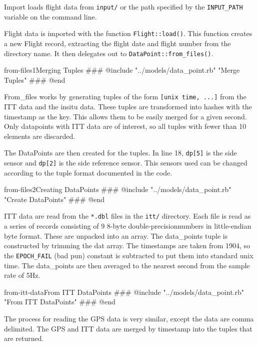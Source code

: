 \documentclass[12pt]{article}
\begin{document}
Import loads flight data from \texttt{input/} or the path specified by the \texttt{INPUT\_PATH} variable on the command line.  

Flight data is imported with the function \texttt{Flight::load()}. This function creates a new Flight record, extracting the flight date and flight number from the directory name.  It then delegates out to \texttt{DataPoint::from\_files()}.

\begin{code}{from-files1}{Merging Tuples}
### @include "../models/data_point.rb" "Merge Tuples"
### @end
\end{code}

From\_files works by generating tuples of the form \texttt{[unix time, ...]} from the ITT data and the insitu data. These tuples are transformed into hashes with the timestamp as the key.  This allows them to be easily merged for a given second.  Only datapoints with ITT data are of interest, so all tuples with fewer than 10 elements are discarded.

The DataPoints are then created for the tuples.  In line 18, \texttt{dp[5]} is the side sensor and \texttt{dp[2]} is the side reference sensor.  This sensors used can be changed according to the tuple format documented in the code. 

\begin{code}{from-files2}{Creating DataPoints}
### @include "../models/data_point.rb" "Create DataPoints"
### @end
\end{code}

ITT data are read from the \texttt{*.dbl} files in the \texttt{itt/} directory.  Each file is read as a series of records consisting of 9 8-byte double-precisionnumbers in little-endian byte format.  These are unpacked into an array.  The data\_points tuple is constructed by trimming the dat array.  The timestamps are taken from 1904, so the \texttt{EPOCH\_FAIL} (bad pun) constant is subtracted to put them into standard unix time.  The data\_points are then averaged to the nearest second from the sample rate of 5Hz.

\begin{code}{from-itt-data}{From ITT DataPoints}
### @include "../models/data_point.rb" "From ITT DataPoints"
### @end
\end{code}

The process for reading the GPS data is very similar, except the data are comma delimited.  The GPS and ITT data are merged by timestamp into the tuples that are returned.
\end{document}
